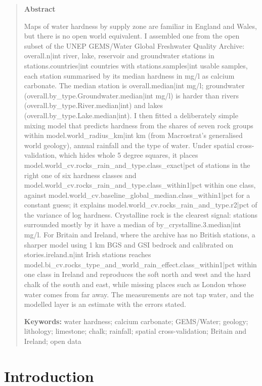 \documentclass[11pt,a4paper]{article}
\begin{document}
\begin{quote}
\small
\begin{center}\textbf{Abstract}\end{center}
Maps of water hardness by supply zone are familiar in England and Wales, but there is no open world equivalent. I assembled one from the open subset of the UNEP GEMS/Water Global Freshwater Quality Archive: {{overall.n|int}} river, lake, reservoir and groundwater stations in {{stations.countries|int}} countries with {{stations.samples|int}} usable samples, each station summarised by its median hardness in mg/l as calcium carbonate. The median station is {{overall.median|int}} mg/l; groundwater ({{overall.by_type.Groundwater.median|int}} mg/l) is harder than rivers ({{overall.by_type.River.median|int}}) and lakes ({{overall.by_type.Lake.median|int}}). I then fitted a deliberately simple mixing model that predicts hardness from the shares of seven rock groups within {{model.world_radius_km|int}} km (from Macrostrat's generalised world geology), annual rainfall and the type of water. Under spatial cross-validation, which hides whole 5 degree squares, it places {{model.world_cv.rocks_rain_and_type.class_exact|pct}} of stations in the right one of six hardness classes and {{model.world_cv.rocks_rain_and_type.class_within1|pct}} within one class, against {{model.world_cv.baseline_global_median.class_within1|pct}} for a constant guess; it explains {{model.world_cv.rocks_rain_and_type.r2|pct}} of the variance of log hardness. Crystalline rock is the clearest signal: stations surrounded mostly by it have a median of {{by_crystalline.3.median|int}} mg/l. For Britain and Ireland, where the archive has no British stations, a sharper model using 1 km BGS and GSI bedrock and calibrated on {{stories.ireland.n|int}} Irish stations reaches {{model.bi_cv.rocks_type_and_world_rain_effect.class_within1|pct}} within one class in Ireland and reproduces the soft north and west and the hard chalk of the south and east, while missing places such as London whose water comes from far away. The measurements are not tap water, and the modelled layer is an estimate with the errors stated.

\textbf{Keywords:} water hardness; calcium carbonate; GEMS/Water; geology; lithology; limestone; chalk; rainfall; spatial cross-validation; Britain and Ireland; open data
\end{quote}

\section{Introduction}
\end{document}
